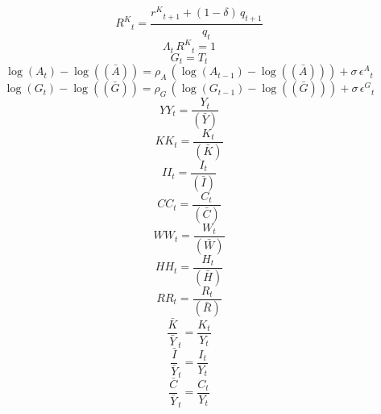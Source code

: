 \begin{dmath}
{R^{K}}_{t}=\frac{{r^{K}}_{t+1}+\left(1-{{\delta}}\right)\, {q}_{t+1}}{{q}_{t}}
\end{dmath}
\begin{dmath}
{\Lambda}_{t}\, {R^{K}}_{t}=1
\end{dmath}
\begin{dmath}
{G}_{t}={T}_{t}
\end{dmath}
\begin{dmath}
\log\left({A}_{t}\right)-\log\left((\bar{A})\right)={{\rho_{A}}}\, \left(\log\left({A}_{t-1}\right)-\log\left((\bar{A})\right)\right)+{{\sigma}}\, {{\epsilon^{A}}}_{t}
\end{dmath}
\begin{dmath}
\log\left({G}_{t}\right)-\log\left((\bar{G})\right)={{\rho_{G}}}\, \left(\log\left({G}_{t-1}\right)-\log\left((\bar{G})\right)\right)+{{\sigma}}\, {{\epsilon^{G}}}_{t}
\end{dmath}
\begin{dmath}
{YY}_{t}=\frac{{Y}_{t}}{(\bar{Y})}
\end{dmath}
\begin{dmath}
{KK}_{t}=\frac{{K}_{t}}{(\bar{K})}
\end{dmath}
\begin{dmath}
{II}_{t}=\frac{{I}_{t}}{(\bar{I})}
\end{dmath}
\begin{dmath}
{CC}_{t}=\frac{{C}_{t}}{(\bar{C})}
\end{dmath}
\begin{dmath}
{WW}_{t}=\frac{{W}_{t}}{(\bar{W})}
\end{dmath}
\begin{dmath}
{HH}_{t}=\frac{{H}_{t}}{(\bar{H})}
\end{dmath}
\begin{dmath}
{RR}_{t}=\frac{{R}_{t}}{(\bar{R})}
\end{dmath}
\begin{dmath}
{\frac{\bar{K}}{\bar{Y}}}_{t}=\frac{{K}_{t}}{{Y}_{t}}
\end{dmath}
\begin{dmath}
{\frac{\bar{I}}{\bar{Y}}}_{t}=\frac{{I}_{t}}{{Y}_{t}}
\end{dmath}
\begin{dmath}
{\frac{\bar{C}}{\bar{Y}}}_{t}=\frac{{C}_{t}}{{Y}_{t}}
\end{dmath}
